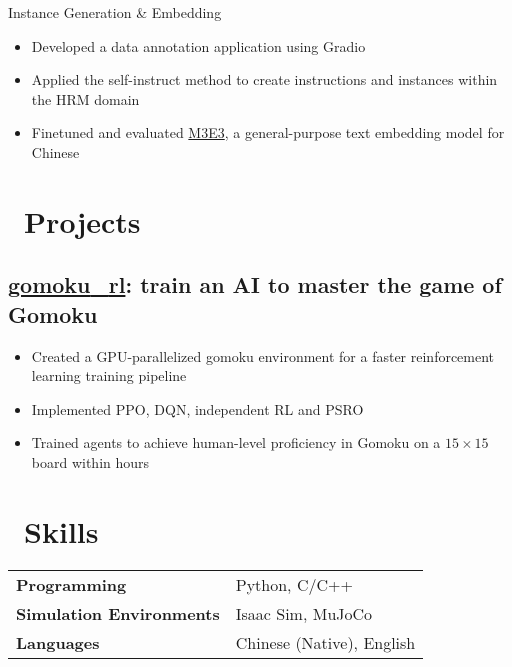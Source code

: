 \documentclass{resume}
\begin{document}
Instance Generation \& Embedding
\begin{itemize}
  \item Developed a data annotation application using Gradio
  \item Applied the self-instruct method to create instructions and instances within the HRM domain
  \item Finetuned and evaluated \href{https://huggingface.co/moka-ai/m3e-base}{M3E3}, a general-purpose text embedding model for Chinese
\end{itemize}

\section{\faRocket\ Projects}

\subsection{\faGithub\space\textbf{\href{https://github.com/hesic73/gomoku_rl}{gomoku{\_}rl}}: train an AI to master the game of Gomoku}

\begin{itemize}
  \item Created a GPU-parallelized gomoku environment for a faster reinforcement learning training pipeline
  \item Implemented PPO, DQN, independent RL and PSRO
  \item Trained agents to achieve human-level proficiency in Gomoku on a $15\times15$ board within hours
\end{itemize}


\section{\faCogs\ Skills}

\begin{tabularx}{\textwidth}{@{}lX@{}}
\textbf{Programming} & Python, C/C++ \\
\textbf{Simulation Environments} & Isaac Sim, MuJoCo \\
\textbf{Languages} & Chinese (Native), English \\
\end{tabularx}



%
%
\end{document}
